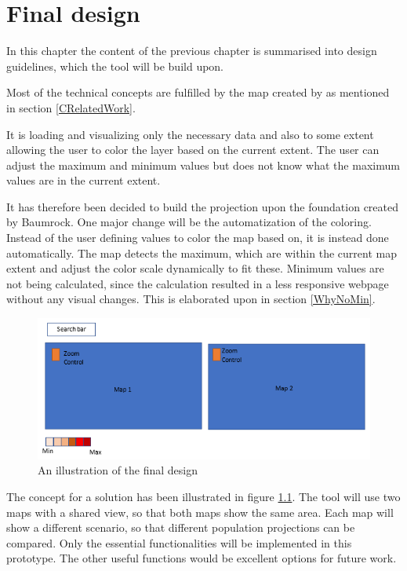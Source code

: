 \chapter{Final design}\label{CFinalDesign}

In this chapter the content of the previous chapter is summarised into design guidelines, which the tool will be build upon. 


Most of the technical concepts are fulfilled by the map created by \citet{Baumrocks} as mentioned in section \ref{CRelatedWork}.

It is loading and visualizing only the necessary data and also to some extent allowing the user to color the layer based on the current extent. The user can adjust the maximum and minimum values but does not know what the maximum values are in the current extent.

It has therefore been decided to build the projection upon the foundation created by Baumrock. One major change will be the automatization of the coloring. Instead of the user defining values to color the map based on, it is instead done automatically. The map detects the maximum, which are within the current map extent and adjust the color scale dynamically to fit these. Minimum values are not being calculated, since the calculation resulted in a less responsive webpage without any visual changes. This is elaborated upon in section \ref{WhyNoMin}. 

\begin{figure} [H]
	\centering
	\includegraphics[width=.8\textwidth]{Pictures/FinalDesign}
	\caption{An illustration of the final design}
	\label{FinalDesignFig}
\end{figure}

The concept for a solution has been illustrated in figure \ref{FinalDesignFig}. The tool will use two maps with a shared view, so that both maps show the same area. Each map will show a different scenario, so that different population projections can be compared. Only the essential functionalities will be implemented in this prototype. The other useful functions would be excellent options for future work.


